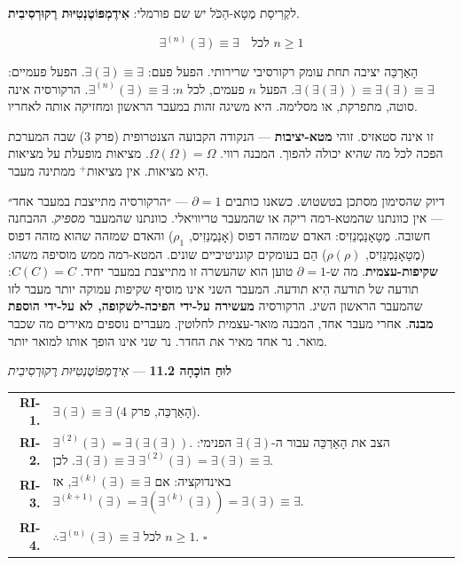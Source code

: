 \documentclass[10pt, openany, oneside]{book}
\renewcommand{\footnotesize}{\fontsize{8.5}{11}\selectfont}
\begin{document}
\vspace{1em}

\noindent לקְרִיסַת מֶטָא-הַכֹּל יש שם פורמלי: \textbf{אִידֶמְפּוֹטֶנְטִיּוּת רֶקוּרְסִיבִית}.

$$\exists^{(n)}(\exists) \equiv \exists \quad \text{לכל } n \geq 1$$

הָאַרְכֵּה יציבה תחת עומק רקורסיבי שרירותי. הפעל פעם: $\exists(\exists) \equiv \exists$. הפעל פעמיים: $\exists(\exists(\exists)) \equiv \exists(\exists) \equiv \exists$. הפעל $n$ פעמים, לכל $n$: $\exists^{(n)}(\exists) \equiv \exists$. הרקורסיה אינה סוטה, מתפרקת, או מסלימה. היא משיגה זהות במעבר הראשון ומחזיקה אותה לאחריו.

זו אינה סטאזיס. זוהי \textbf{מטא-יציבות} — הנקודה הקבועה הצנטרופית (פרק 3) שבה המערכת הפכה לכל מה שהיא יכולה להפוך. המבנה רווי. $\Omega(\Omega) = \Omega$. מציאות מופעלת על מציאות הִיא מציאות. אין מציאות$^+$ ממתינה מעבר.

דיוק שהסימון מסתכן בטשטוש. כשאנו כותבים $\partial = 1$ — ״הרקורסיה מתייצבת במעבר אחד״ — אין כוונתנו שהמטא-רמה ריקה או שהמעבר טריוויאלי. כוונתנו שהמעבר \textit{מספיק}. ההבחנה חשובה. מֶטָאָנַמְנֵזִיס: האדם שמזהה דפוס (אָנַמְנֵזִיס, $\rho_1$) והאדם שמזהה שהוא מזהה דפוס (מֶטָאָנַמְנֵזִיס, $\rho(\rho)$) הֵם בעומקים קוגניטיביים שונים. המטא-רמה ממש מוסיפה משהו: \textbf{שקיפות-עצמית}. מה ש-$\partial = 1$ טוען הוא שהעשרה זו מתייצבת במעבר יחיד. $C(C) = C$: תודעה של תודעה הִיא תודעה. המעבר השני אינו מוסיף שקיפות עמוקה יותר מעבר לזו שהמעבר הראשון השיג. הרקורסיה \textbf{מעשירה על-ידי הפיכה-לשקופה, לא על-ידי הוספת מבנה}. אחרי מעבר אחד, המבנה מואר-עצמית לחלוטין. מעברים נוספים מאירים מה שכבר מואר. נר אחד מאיר את החדר. נר שני אינו הופך אותו למואר יותר.

\vspace{0.5em}

\textbf{לוּחַ הוֹכָחָה 11.2} --- \textit{אִידֶמְפּוֹטֶנְטִיּוּת רֶקוּרְסִיבִית}

\vspace{0.5em}

{\footnotesize
\noindent\begin{tabular}{r p{}}
\textbf{RI-1.} & $\exists(\exists) \equiv \exists$ (הָאַרְכֵּה, פרק 4). \\[0.3em]
\textbf{RI-2.} & $\exists^{(2)}(\exists) = \exists(\exists(\exists))$. הצב את הָאַרְכֵּה עבור ה-$\exists(\exists)$ הפנימי: $\exists(\exists) \equiv \exists$. לכן $\exists^{(2)}(\exists) = \exists(\exists) \equiv \exists$. \\[0.3em]
\textbf{RI-3.} & באינדוקציה: אם $\exists^{(k)}(\exists) \equiv \exists$, אז $\exists^{(k+1)}(\exists) = \exists(\exists^{(k)}(\exists)) = \exists(\exists) \equiv \exists$. \\[0.3em]
\textbf{RI-4.} & $\therefore \exists^{(n)}(\exists) \equiv \exists$ לכל $n \geq 1$. $\square$ \\[0.3em]
\end{tabular}
}
\end{document}

